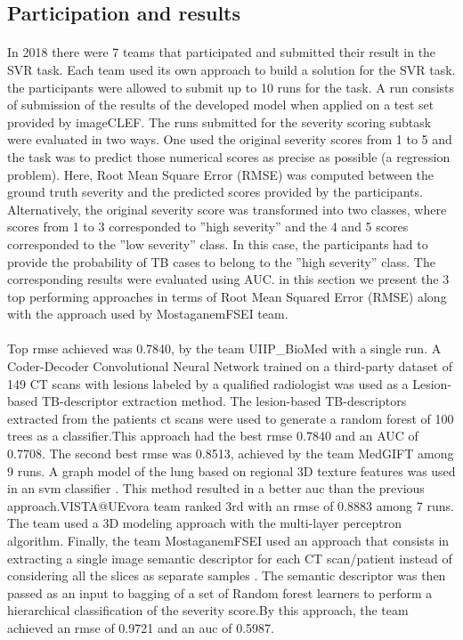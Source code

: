 \subsection{Participation and results}
\paragraph{}
In 2018 there were 7 teams that participated and submitted their result in the SVR task. Each team used its own approach to build a solution for the SVR task. the participants were allowed to submit up to 10 runs for the task. A run consists of submission
of the results of the developed model when applied on a test set provided by imageCLEF. The runs submitted for the severity scoring subtask were evaluated in two ways. One used the original severity scores from 1 to 5 and the task was to predict those numerical scores as precise as possible (a regression problem). Here, Root Mean Square Error (RMSE) was computed between the ground truth severity and the predicted scores provided by the participants. Alternatively, the original severity score was transformed into two classes, where scores from 1 to 3 corresponded to ”high severity” and the 4 and 5 scores corresponded to the ”low severity” class. In this case, the participants had to provide the probability of TB cases to belong to the ”high severity” class. The corresponding results were evaluated using AUC. in this section we present the 3 top performing approaches in terms of Root Mean Squared Error (RMSE) along with the approach used by MostaganemFSEI team.
\paragraph{}
Top \acs{rmse} achieved was 0.7840, by the team UIIP\_BioMed with a single run. A Coder-Decoder Convolutional Neural Network trained on a third-party dataset of 149 CT scans with lesions labeled by a qualified radiologist was used as a Lesion-based TB-descriptor extraction method. The lesion-based TB-descriptors extracted from the patients \acs{ct} scans were used to generate a random forest of 100 trees as a classifier\cite{lesionBased}.This approach had the best \acs{rmse} 0.7840 and an AUC of 0.7708. The second best \acs{rmse} was 0.8513, achieved by the team MedGIFT among 9 runs. A graph model of the lung based on regional 3D texture features was used in an \acs{svm} classifier \cite{textureBased}. This method resulted in a better \acs{auc} than the previous approach.VISTA@UEvora team ranked 3rd with an \acs{rmse} of 0.8883 among 7 runs. The team used a 3D modeling approach with the multi-layer perceptron algorithm.
Finally, the team MostaganemFSEI used an approach that consists in extracting a single image semantic descriptor for each CT scan/patient instead of considering all the slices as separate samples \cite{semanticDescriptor}. The semantic descriptor was then passed as an input to bagging of a set of Random forest learners to perform a hierarchical classification of the severity score.By this approach, the team achieved an \acs{rmse} of 0.9721 and an \acs{auc} of 0.5987.

